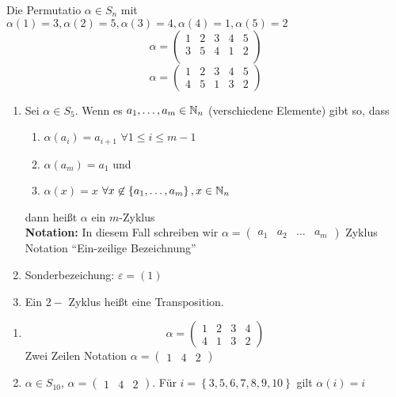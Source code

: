 \begin{subexample}
	Die Permutatio $ \alpha \in S_n $ mit $ \alpha(1) = 3, \alpha(2) = 5, \alpha(3) = 4, \alpha(4) = 1, \alpha(5) = 2 $
	\[
		\alpha =
		\begin{pmatrix} 
			1 & 2 & 3 & 4  & 5\\
			3 & 5 & 4 & 1 & 2\\
		\end{pmatrix} 
	\]
	\[
		\alpha =
		\begin{pmatrix} 
			1 & 2 & 3 & 4 & 5\\
			4 & 5 & 1 & 3 & 2
		\end{pmatrix} 
	\]
\end{subexample}

\begin{subdefinition}
	\begin{enumerate}[label=(\roman*)]
		\item 
			Sei $ \alpha \in S_5 $.
			Wenn es $ a_1, \dotsc, a_m \in \mathbb{N} _n $ (verschiedene Elemente) gibt so, dass
			\begin{enumerate}[label=(\roman*)]
				\item $ \alpha(a_i) = a_{i + 1}  $ $ \forall 1 \leq i \leq m - 1 $ 
				\item $ \alpha(a_m) = a_1 $ und
				\item $ \alpha(x) = x $ $ \forall x \not\in \left\{ a_1, \dotsc, a_m \right\} , x \in \mathbb{N} _n $
			\end{enumerate}
			dann heißt $ \alpha $ ein $ m $-Zyklus\\
			\textbf{Notation:} In diesem Fall schreiben wir $ \alpha = \begin{pmatrix} a_1 & a_2 & \dotsc & a_m \end{pmatrix}  $ Zyklus Notation
			``Ein-zeilige Bezeichnung''
		\item Sonderbezeichung: $ \varepsilon = (1) $ 
		\item Ein $ 2- $ Zyklus heißt eine Transposition.
	\end{enumerate}
\end{subdefinition}

\begin{subexample}
	\begin{enumerate}[label=(\roman*)]
		\item 
			\[
				\alpha =
				\begin{pmatrix} 
					1 & 2 & 3 & 4\\
					4 & 1 & 3 & 2
				\end{pmatrix} 
			\]
			Zwei Zeilen Notation
			$ \alpha = \begin{pmatrix} 1 & 4 & 2 \end{pmatrix}  $
		\item $ \alpha \in S_{10} $, $ \alpha = \begin{pmatrix} 1 & 4 & 2 \end{pmatrix}  $.
			Für $ i = \left\{ 3, 5, 6, 7, 8, 9, 10 \right\}  $ gilt $ \alpha(i) = i $
	\end{enumerate}
\end{subexample}

